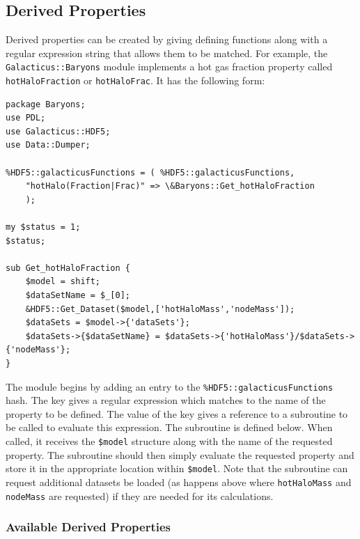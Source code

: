 \subsection{Derived Properties}

Derived properties can be created by giving defining functions along with a regular expression string that allows them to be matched. For example, the {\tt Galacticus::Baryons} module implements a hot gas fraction property called {\tt hotHaloFraction} or {\tt hotHaloFrac}. It has the following form:
\begin{verbatim}
package Baryons;
use PDL;
use Galacticus::HDF5;
use Data::Dumper;

%HDF5::galacticusFunctions = ( %HDF5::galacticusFunctions,
    "hotHalo(Fraction|Frac)" => \&Baryons::Get_hotHaloFraction
    );

my $status = 1;
$status;

sub Get_hotHaloFraction {
    $model = shift;
    $dataSetName = $_[0];
    &HDF5::Get_Dataset($model,['hotHaloMass','nodeMass']);
    $dataSets = $model->{'dataSets'};
    $dataSets->{$dataSetName} = $dataSets->{'hotHaloMass'}/$dataSets->{'nodeMass'};
}

\end{verbatim}
The module begins by adding an entry to the {\tt \%HDF5::galacticusFunctions} hash. The key gives a regular expression which matches to the name of the property to be defined. The value of the key gives a reference to a subroutine to be called to evaluate this expression. The subroutine is defined below. When called, it receives the {\tt \$model} structure along with the name of the requested property. The subroutine should then simply evaluate the requested property and store it in the appropriate location within {\tt \$model}. Note that the subroutine can request additional datasets be loaded (as happens above where {\tt hotHaloMass} and {\tt nodeMass} are requested) if they are needed for its calculations.

\subsubsection{Available Derived Properties}\label{sec:DerivedProperties}

